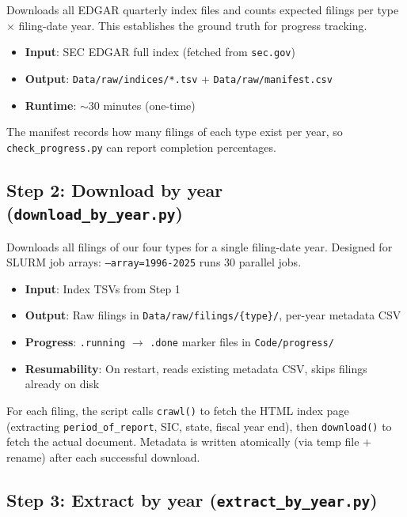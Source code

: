 \documentclass[11pt]{article}
\begin{document}
Downloads all EDGAR quarterly index files and counts expected filings per type $\times$ filing-date year. This establishes the ground truth for progress tracking.

\begin{itemize}
  \item \textbf{Input}: SEC EDGAR full index (fetched from \texttt{sec.gov})
  \item \textbf{Output}: \texttt{Data/raw/indices/*.tsv} + \texttt{Data/raw/manifest.csv}
  \item \textbf{Runtime}: $\sim$30 minutes (one-time)
\end{itemize}

The manifest records how many filings of each type exist per year, so \texttt{check\_progress.py} can report completion percentages.

\subsection{Step 2: Download by year (\texttt{download\_by\_year.py})}

Downloads all filings of our four types for a single filing-date year. Designed for SLURM job arrays: \texttt{--array=1996-2025} runs 30 parallel jobs.

\begin{itemize}
  \item \textbf{Input}: Index TSVs from Step 1
  \item \textbf{Output}: Raw filings in \texttt{Data/raw/filings/\{type\}/}, per-year metadata CSV
  \item \textbf{Progress}: \texttt{.running} $\to$ \texttt{.done} marker files in \texttt{Code/progress/}
  \item \textbf{Resumability}: On restart, reads existing metadata CSV, skips filings already on disk
\end{itemize}

For each filing, the script calls \texttt{crawl()} to fetch the HTML index page (extracting \texttt{period\_of\_report}, SIC, state, fiscal year end), then \texttt{download()} to fetch the actual document. Metadata is written atomically (via temp file + rename) after each successful download.

\subsection{Step 3: Extract by year (\texttt{extract\_by\_year.py})}
\end{document}
